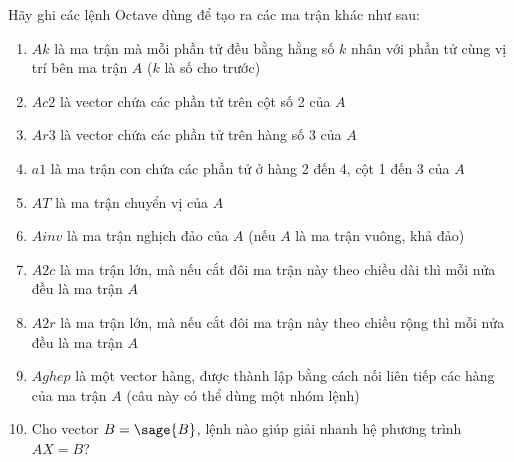 \documentclass[12pt]{article}
\begin{document}
Hãy ghi các lệnh Octave dùng để tạo ra các ma trận khác như sau:
\begin{enumerate}
 \item $Ak$ là ma trận mà mỗi phần tử đều bằng hằng số $k$ nhân với phần tử cùng vị trí bên ma trận $A$ ($k$ là số cho trước)
 \item $Ac2$ là vector chứa các phần tử trên cột số 2 của $A$
 \item $Ar3$ là vector chứa các phần tử trên hàng số 3 của $A$
 \item $a1$ là ma trận con chứa các phần tử ở hàng 2 đến 4, cột 1 đến 3 của $A$
 \item $AT$ là ma trận chuyển vị của $A$
 \item $Ainv$ là ma trận nghịch đảo của $A$ (nếu $A$ là ma trận vuông, khả đảo)
 \item $A2c$ là ma trận lớn, mà nếu cắt đôi ma trận này theo chiều dài thì mỗi nửa đều là ma trận $A$
 \item $A2r$ là ma trận lớn, mà nếu cắt đôi ma trận này theo chiều rộng thì mỗi nửa đều là ma trận $A$
 \item $Aghep$ là một vector hàng, được thành lập bằng cách nối liên tiếp các hàng của ma trận $A$ (câu này có thể dùng một nhóm lệnh)
 \item Cho vector $B=\sage{B}$, lệnh nào giúp giải nhanh hệ phương trình $AX=B$?
\end{enumerate}
\end{document}

